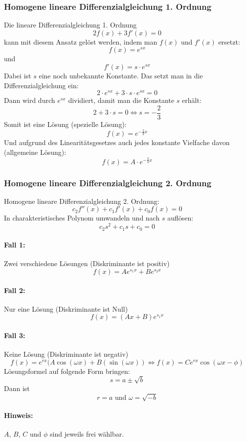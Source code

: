 \subsubsection{Homogene lineare Differenzialgleichung 1. Ordnung}
Die lineare Differenzialgleichung 1. Ordnung
\[ 2f(x) + 3f'(x) = 0 \]
kann mit diesem Ansatz gelöst werden, indem man $f(x)$ und $f'(x)$
ersetzt:
\[ f(x) = e^{sx} \] und
\[ f'(x) = s \cdot e^{sx} \]
Dabei ist $s$ eine noch unbekannte Konstante. Das setzt man in die
Differenzialgleichung ein:
\[ 2 \cdot e^{sx} + 3 \cdot s \cdot e^{sx} = 0 \]
Dann wird durch $e^{sx}$ dividiert, damit man die Konstante $s$ erhält:
\[ 2 + 3 \cdot s = 0 \Leftrightarrow s = - \frac{2}{3} \]
Somit ist eine Lösung (spezielle Lösung):
\[f(x) = e^{-\frac{2}{3}x} \]
Und aufgrund des Linearitätsgesetzes auch jedes konstante Vielfache
davon (allgemeine Lösung):
\[f(x) = A \cdot e^{-\frac{2}{3}x} \]

\subsubsection{Homogene lineare Differenzialgleichung 2. Ordnung}
Homogene lineare Differenzialgleichung 2. Ordnung:
\[ c_2f''(x) + c_1f'(x) + c_0f(x) = 0 \]
In charakteristisches Polynom umwandeln und nach $s$ auflösen:
\[ c_2s^2 + c_1s + c_0 = 0 \]
\paragraph{Fall 1:} Zwei verschiedene Lösungen (Diskriminante ist positiv)
\[ f(x) = Ae^{s_1x} + Be^{s_2x} \]
\paragraph{Fall 2:} Nur eine Lösung (Diskriminante ist Null)
\[ f(x) = (Ax + B) e^{s_1x} \]
\paragraph{Fall 3:} Keine Lösung (Diskriminante ist negativ)
\[ f(x) = e^{rx} (A\cos(\omega x) + B (\sin(\omega x)) \Leftrightarrow
  f(x) = Ce^{rx} \cos(\omega x - \phi) \]
Lösungsformel auf folgende Form bringen:
\[ s = a \pm \sqrt{b} \]
Dann ist
\[ r = a \text{ und } \omega = \sqrt{-b} \]
\paragraph{Hinweis:} $A$, $B$, $C$ und $\phi$ sind jeweils frei wählbar.

